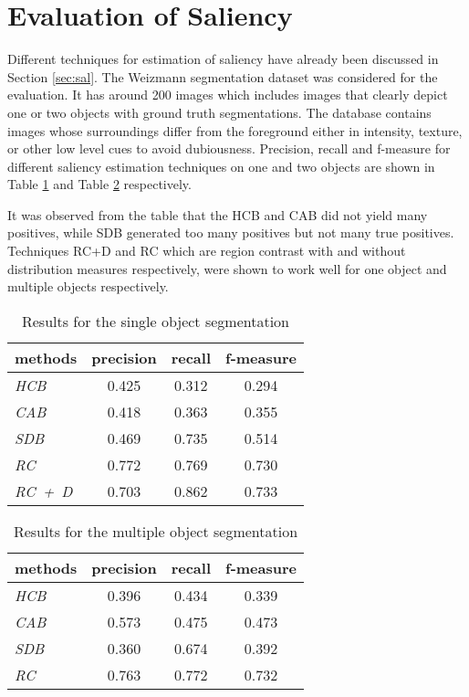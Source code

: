 \section{Evaluation of Saliency}
\label{sec:EvS}
Different techniques for estimation of saliency have  already been discussed in Section \ref{sec:sal}.  The Weizmann segmentation dataset was considered for the evaluation.  It has around 200 images which includes images that clearly depict one or two objects with ground truth segmentations. The database contains images whose surroundings differ from the foreground  either in intensity, texture, or other low level cues to avoid dubiousness.  Precision, recall and f-measure for different saliency estimation techniques on one and two objects are shown in Table \ref{tab:salOneObj} and Table \ref{tab:salTwoObj} respectively. 
\par It was observed from the table that the HCB and CAB did not yield many positives, while SDB generated too many positives but not many true positives. Techniques RC+D and RC which are region contrast with and without distribution measures respectively, were shown to work well for one object and multiple objects respectively.
\begin{table}[htbp]
   \caption{Results for the single object segmentation}
   \begin{center}
   \begin{tabular}{|l|c|c|c|} \hline
     \textbf{methods} & \textbf{precision} & \textbf{recall} & \textbf{f-measure} \\ \hline
     \emph{HCB} & 0.425 & 0.312 & 0.294 \\
	 \emph{CAB} & 0.418 & 0.363 & 0.355 \\
 	 \emph{SDB} & 0.469 & 0.735 & 0.514 \\
	 \emph{RC}  & 0.772 & 0.769 & 0.730 \\
	 \emph{RC~+~D} & 0.703	& 0.862 & 0.733	\\ \hline
   \end{tabular}
   \label{tab:salOneObj}
   \medskip \small 
   \end{center}
 \end{table}
\begin{table}[htbp]
   \caption{Results for the multiple object segmentation}
   \begin{center}
   \begin{tabular}{|l|c|c|c|} \hline
     \textbf{methods} & \textbf{precision} & \textbf{recall} & \textbf{f-measure} \\ \hline
     \emph{HCB} & 0.396 & 0.434 & 0.339 \\
	 \emph{CAB} & 0.573 & 0.475 & 0.473 \\
 	 \emph{SDB} & 0.360 & 0.674 & 0.392 \\
	 \emph{RC}  & 0.763 & 0.772 & 0.732 \\ \hline
   \end{tabular}
   \label{tab:salTwoObj}
   \end{center}
 \end{table} 
